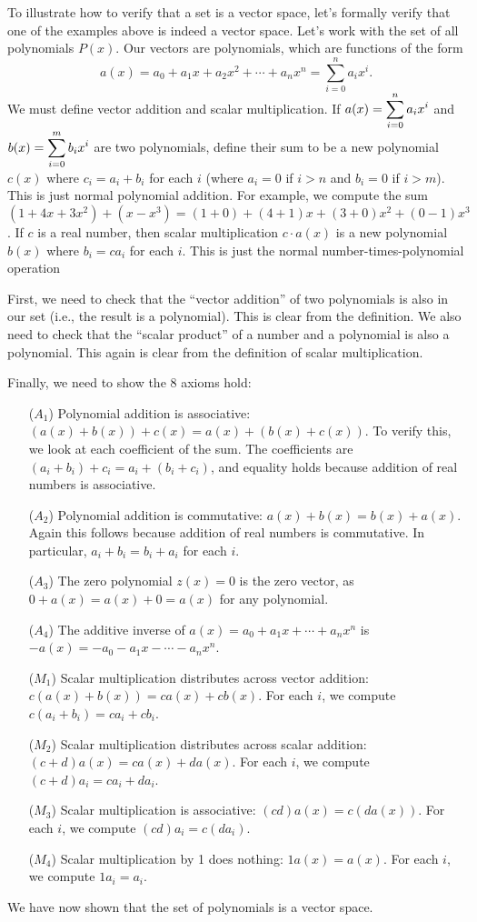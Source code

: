 \begin{example} 
To illustrate how to verify that a set is a vector space, let's formally verify that one of the examples above is indeed a vector space. Let's work with the set of all polynomials $P(x)$. Our vectors are polynomials, which are functions of the form
$$a(x) = a_0 +a_1 x+a_2 x^2 + \cdots + a_n x^n = \sum_{i=0}^n a_i x^i.$$
We must define vector addition and scalar multiplication.  
If $\displaystyle a(x) =  \sum_{i=0}^n a_i x^i$ and $\displaystyle b(x) =  \sum_{i=0}^m b_i x^i$ are two polynomials, define their sum to be a new polynomial $c(x)$ where $c_i = a_i+b_i$ for each $i$ (where $a_i=0$ if $i> n$ and $b_i=0$ if $i> m$). This is just normal polynomial addition.
For example, we compute the sum $(1+4x+3x^2)+(x-x^3) = (1+0)+(4+1)x+(3+0)x^2+(0-1)x^3$. If $c$ is a real number, then scalar multiplication $c\cdot a(x)$ is a new polynomial $b(x)$ where $b_i=ca_i$ for each $i$.  This is just the normal number-times-polynomial operation

First, we need to check that the ``vector addition'' of two polynomials is also in our set (i.e., the result is a polynomial).  This is clear from the definition.  We also need to check that the ``scalar product'' of a number and a polynomial is also a polynomial.  This again is clear from the definition of scalar multiplication.

Finally, we need to show the 8 axioms hold:
\begin{enumerate}
	\item[($A_1$)] Polynomial addition is associative: $(a(x)+b(x))+c(x) = a(x) +(b(x)+c(x))$. To verify this, we look at each coefficient of the sum.  The coefficients are $(a_i+b_i)+c_i = a_i+(b_i+c_i)$, and equality holds because addition of real numbers is associative.
	\item[($A_2$)] Polynomial addition is commutative: $a(x)+b(x)=b(x)+a(x)$. Again this follows because addition of real numbers is commutative. In particular, $a_i+b_i=b_i+a_i$ for each $i$.
	\item[($A_3$)] The zero polynomial $z(x)=0$ is the zero vector, as $0+a(x) = a(x)+0=a(x)$ for any polynomial.
	\item[($A_4$)] The additive inverse of $a(x) = a_0+a_1x+\cdots+a_nx^n$ is $-a(x) = -a_0-a_1x-\cdots-a_nx^n$.
	\item[($M_1$)] Scalar multiplication distributes across vector addition: $c(a(x)+b(x))= ca(x) + cb(x)$. For each $i$, we compute $c(a_i+b_i) = ca_i+cb_i$. 
	\item[($M_2$)] Scalar multiplication distributes across scalar addition: $(c+d)a(x)= ca(x)+ da(x)$. For each $i$, we compute $(c+d)a_i = ca_i+da_i$. 
	\item[($M_3$)] Scalar multiplication is associative: $(cd)a(x) = c(da(x))$. For each $i$, we compute $(cd)a_i = c(da_i)$.
	\item[($M_4$)] Scalar multiplication by 1 does nothing: $1a(x)=a(x)$. For each $i$, we compute $1a_i = a_i$.
\end{enumerate}
We have now shown that the set of polynomials is a vector space.
\end{example}

